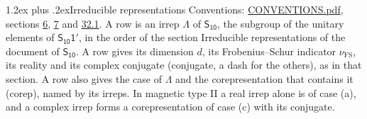 \documentclass[10pt,a4paper]{article}
\makeatletter
\renewcommand\section{\@startsection{section}{1}{\z@}{-3ex plus -1ex minus -.2ex}%
  {1.2ex plus .2ex}{\normalfont\large\sffamily\bfseries\color{parttitle}}}
\numberwithin{equation}{section}
\newcommand{\grp}[1]{\mathsf{#1}}
\newcommand{\fsind}{\nu_{\mathrm{FS}}}
\makeatother
\begin{document}
\section{Irreducible representations}\label{s:irreps}
Conventions: \href{../../CONVENTIONS.pdf}{CONVENTIONS.pdf}, sections \href{../../../rotation/CONVENTIONS.pdf\#conv.6}{6}, \href{../../../rotation/CONVENTIONS.pdf\#conv.7}{7} and \href{../../CONVENTIONS.pdf\#conv.32.1}{32.1}.
\leavevmode\label{n:irrep.Delta}A row is an irrep $\Lambda$ of $\grp{S_{10}}$, the subgroup of the unitary elements of $\grp{S_{10}1'}$, in the order of the section Irreducible representations of the document of \href{../../../rotation/data/pdf/S10.pdf}{$\grp{S_{10}}$}. \label{n:index.dimension}\label{n:index.frobenius}\label{n:head.irrep}\label{n:head.reality}\label{n:head.conjugate}A row gives its dimension $d$, its Frobenius--Schur indicator $\fsind$, its reality and its complex conjugate (conjugate, a dash for the others), as in that section. \label{n:head.case.corep}\label{n:head.corep}A row also gives the case of $\Lambda$ and the corepresentation that contains it (corep), named by its irreps. In magnetic type II a real irrep alone is of case (a), and a complex irrep forms a corepresentation of case (c) with its conjugate.
\setlength{\emergencystretch}{2em}\par\setlength{\emergencystretch}{0pt}
\end{document}

